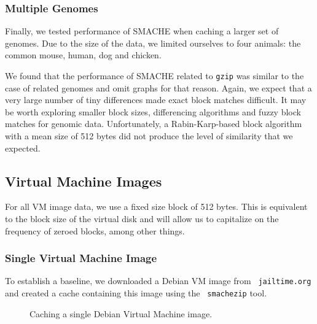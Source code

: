 \documentclass{sigplanconf}[11pt]
\begin{document}
\subsubsection*{Multiple Genomes}

Finally, we tested performance of SMACHE when caching a larger set of genomes.
Due to the size of the data, we limited ourselves to four animals: the common
mouse, human, dog and chicken.

We found that the performance of SMACHE related to {\tt gzip} was similar to
the case of related genomes and omit graphs for that reason.  Again, we expect
that a very large number of tiny differences made exact block matches
difficult.  It may be worth exploring smaller block sizes, differencing
algorithms and fuzzy block matches for genomic data.  Unfortunately, a
Rabin-Karp-based block algorithm with a mean size of 512 bytes did not produce
the level of similarity that we expected.

\subsection{Virtual Machine Images}

For all VM image data, we use a fixed size block of 512 bytes.  This is
equivalent to the block size of the virtual disk and will allow us to
capitalize on the frequency of zeroed blocks, among other things.

\subsubsection*{Single Virtual Machine Image}

To establish a baseline, we downloaded a Debian VM image from {\tt
jailtime.org} and created a cache containing this image using the {\tt
smachezip} tool.

\begin{figure}
\begin{center}
\caption{Caching a single Debian Virtual Machine image.}
\end{center}
\end{figure}
\end{document}

